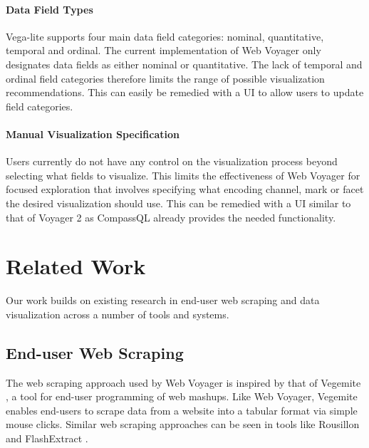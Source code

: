 \documentclass[sigconf,screen]{acmart}
\begin{document}
\hypertarget{data-field-types}{%
\paragraph{Data Field Types}\label{data-field-types}}

Vega-lite supports four main data field categories: nominal,
quantitative, temporal and ordinal. The current implementation of Web
Voyager only designates data fields as either nominal or quantitative.
The lack of temporal and ordinal field categories therefore limits the
range of possible visualization recommendations. This can easily be
remedied with a UI to allow users to update field categories.

\hypertarget{manual-visualization-specification}{%
\paragraph{Manual Visualization
Specification}\label{manual-visualization-specification}}

Users currently do not have any control on the visualization process
beyond selecting what fields to visualize. This limits the effectiveness
of Web Voyager for focused exploration that involves specifying what
encoding channel, mark or facet the desired visualization should use.
This can be remedied with a UI similar to that of Voyager 2 as CompassQL
already provides the needed functionality.

\hypertarget{sec:related-work}{%
\section{Related Work}\label{sec:related-work}}

Our work builds on existing research in end-user web scraping and data
visualization across a number of tools and systems.

\hypertarget{end-user-web-scraping}{%
\subsection{End-user Web Scraping}\label{end-user-web-scraping}}

The web scraping approach used by Web Voyager is inspired by that of
Vegemite \citep{lin2009}, a tool for end-user programming of web
mashups. Like Web Voyager, Vegemite enables end-users to scrape data
from a website into a tabular format via simple mouse clicks. Similar
web scraping approaches can be seen in tools like Rousillon
\citep{chasins2018} and FlashExtract \citep{le2014}.
\end{document}
